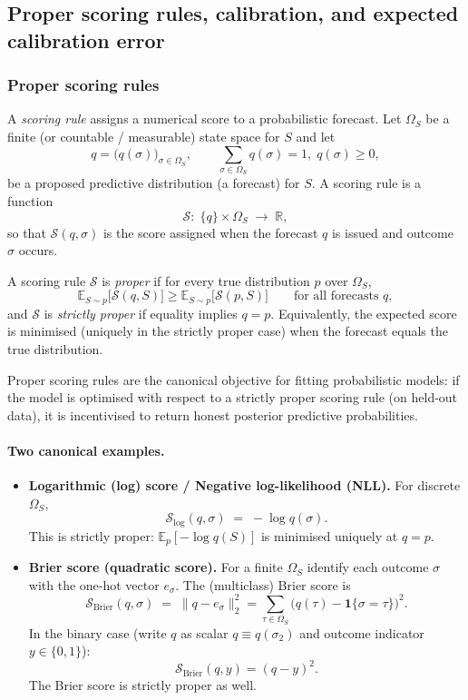 \subsection{Proper scoring rules, calibration, and expected calibration error}
\label{sec:scoring_calibration}

\subsubsection{Proper scoring rules}
A \emph{scoring rule} assigns a numerical score to a probabilistic forecast.  Let \(\Omega_S\) be a finite (or countable / measurable) state space for \(S\) and let
\[
q = \big(q(\sigma)\big)_{\sigma\in\Omega_S},\qquad \sum_{\sigma\in\Omega_S} q(\sigma)=1,\; q(\sigma)\ge0,
\]
be a proposed predictive distribution (a forecast) for \(S\).  A scoring rule is a function
\[
\mathcal{S}:\; \{q\}\times \Omega_S \;\longrightarrow\; \mathbb{R},
\]
so that \(\mathcal{S}(q,\sigma)\) is the score assigned when the forecast \(q\) is issued and outcome \(\sigma\) occurs.

\begin{definition}
	A scoring rule \(\mathcal{S}\) is \emph{proper} if for every true distribution \(p\) over \(\Omega_S\),
	\[
	\mathbb{E}_{S\sim p}\big[\mathcal{S}(q,S)\big] \ge \mathbb{E}_{S\sim p}\big[\mathcal{S}(p,S)\big]
	\qquad\text{for all forecasts } q,
	\]
	and \(\mathcal{S}\) is \emph{strictly proper} if equality implies \(q=p\).  Equivalently, the expected score is minimised (uniquely in the strictly proper case) when the forecast equals the true distribution.
\end{definition}

Proper scoring rules are the canonical objective for fitting probabilistic models: if the model is optimised with respect to a strictly proper scoring rule (on held-out data), it is incentivised to return honest posterior predictive probabilities.

\paragraph{Two canonical examples.}
\begin{itemize}
	\item \textbf{Logarithmic (log) score / Negative log-likelihood (NLL).} For discrete \(\Omega_S\),
	\[
	\mathcal{S}_{\mathrm{log}}(q,\sigma) \;=\; -\log q(\sigma).
	\]
	This is strictly proper: \(\mathbb{E}_p[-\log q(S)]\) is minimised uniquely at \(q=p\).
	\item \textbf{Brier score (quadratic score).} For a finite \(\Omega_S\) identify each outcome \(\sigma\) with the one-hot vector \(e_\sigma\).  The (multiclass) Brier score is
	\[
	\mathcal{S}_{\mathrm{Brier}}(q,\sigma)\;=\; \|q - e_\sigma\|_2^2 = \sum_{\tau\in\Omega_S}\big(q(\tau)-\mathbf{1}\{\sigma=\tau\}\big)^2.
	\]
	In the binary case (write \(q\) as scalar \(q\equiv q(\sigma_2)\) and outcome indicator \(y\in\{0,1\}\)):
	\[
	\mathcal{S}_{\mathrm{Brier}}(q,y) = (q-y)^2.
	\]
	The Brier score is strictly proper as well.
\end{itemize}

